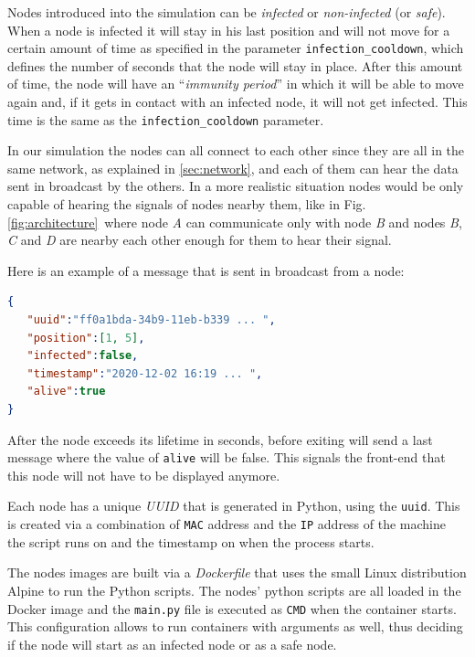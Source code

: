 \documentclass[conference]{IEEEtran}
\begin{document}
		Nodes introduced into the simulation can be \textit{infected} or \textit{non-infected} (or \textit{safe}).
		When a node is infected it will stay in his last position and will not move for a certain amount of time as specified in the parameter \texttt{infection\_cooldown}, which defines the number of seconds that the node will stay in place.
		After this amount of time, the node will have an ``\textit{immunity period}'' in which it will be able to move again and, if it gets in contact with an infected node, it will not get infected.
		This time is the same as the \texttt{infection\_cooldown} parameter.
		
		In our simulation the nodes can all connect to each other since they are all in the same network, as explained in \ref{sec:network}, and each of them can hear the data sent in broadcast by the others.
		In a more realistic situation nodes would be only capable of hearing the signals of nodes nearby them, like in Fig.\ref{fig:architecture}~where node \textit{A} can communicate only with node \textit{B} and nodes \textit{B}, \textit{C} and \textit{D} are nearby each other enough for them to hear their signal.

		Here is an example of a message that is sent in broadcast from a node:
		\begin{lstlisting}[language=json]
{  
   "uuid":"ff0a1bda-34b9-11eb-b339 ... ",
   "position":[1, 5],
   "infected":false,
   "timestamp":"2020-12-02 16:19 ... ",
   "alive":true
}  
		\end{lstlisting}
		
		After the node exceeds its lifetime in seconds, before exiting will send a last message where the value of \texttt{alive} will be false.
		This signals the front-end that this node will not have to be displayed anymore.
		
		Each node has a unique \textit{UUID} that is generated in Python, using the \texttt{uuid}\cite{uuid}.
		This is created via a combination of \texttt{MAC} address and the \texttt{IP} address of the machine the script runs on and the timestamp on when the process starts.

		The nodes images are built via a \textit{Dockerfile} that uses the small Linux distribution Alpine to run the Python scripts.
		The nodes' python scripts are all loaded in the Docker image and the \texttt{main.py} file is executed as \texttt{CMD} when the container starts.
		This configuration allows to run containers with arguments as well, thus deciding if the node will start as an infected node or as a safe node.
	
\end{document}

